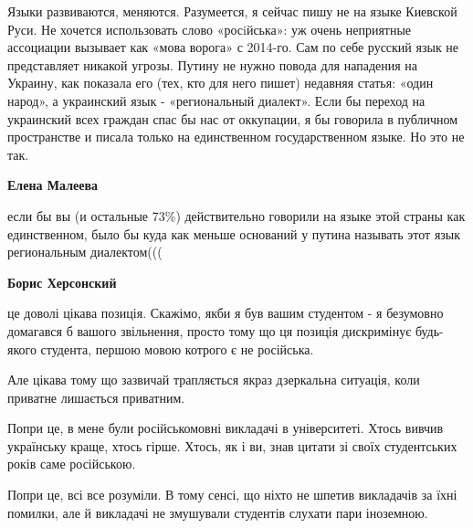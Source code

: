 \begin{itemize}
\begin{itemize}
 

Языки развиваются, меняются. Разумеется, я сейчас пишу не на языке Киевской
Руси. Не хочется использовать слово «росiйська»: уж очень неприятные ассоциации
вызывает как «мова ворога» с 2014-го. Сам по себе русский язык не представляет
никакой угрозы. Путину не нужно повода для нападения на Украину, как показала
его (тех, кто для него пишет) недавняя статья: «один народ», а украинский язык
- «региональный диалект». Если бы переход на украинский всех граждан спас бы
нас от оккупации, я бы говорила в публичном пространстве и писала только на
единственном государственном языке. Но это не так.


 
\textbf{Елена Малеева} 

если бы вы (и остальные 73\%) действительно говорили на языке этой страны как
единственном, было бы куда как меньше оснований у путина называть этот язык
региональным диалектом(((

 

\textbf{Борис Херсонский} 

це доволі цікава позиція. Скажімо, якби я був вашим студентом - я безумовно
домагався б вашого звільнення, просто тому що ця позиція дискримінує будь-якого
студента, першою мовою котрого є не російська.

Але цікава тому що зазвичай трапляється якраз дзеркальна ситуація, коли
приватне лишається приватним.

Попри це, в мене були російськомовні викладачі в університеті. Хтось вивчив
українську краще, хтось гірше. Хтось, як і ви, знав цитати зі своїх
студентських років саме російською.

Попри це, всі все розуміли. В тому сенсі, що ніхто не шпетив викладачів за їхні
помилки, але й викладачі не змушували студентів слухати пари іноземною.



\end{itemize}
\end{itemize}
